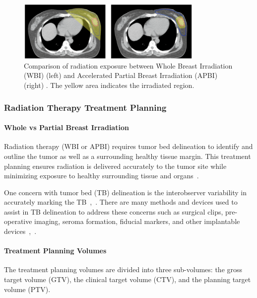 \begin{figure}[h!]
        \centering
        \includegraphics[width=0.8\textwidth]{../figs/introduction/WBI_vs_APBI_irradiation_comparison.png}
        \caption{Comparison of radiation exposure between Whole Breast Irradiation (WBI) (left) and Accelerated Partial Breast Irradiation (APBI) (right) \cite{RefWorks:RefID:157-thomasscience}. The yellow area indicates the irradiated region.}
        \label{fig:introduction:WBI_vs_APBI_irradiation_comparison}
\end{figure}

\subsubsection{Radiation Therapy Treatment Planning\label{sec:introduction:radiationtherapy:treatmentplanning}}

\paragraph*{Whole vs Partial Breast Irradiation\label{sec:introduction:radiationtherapy:treatmentplanning:WBIvsPBI}}
Radiation therapy (WBI or APBI) requires tumor bed delineation to identify and outline the tumor as well as a surrounding healthy tissue margin. This treatment planning ensures radiation is delivered accurately to the tumor site while minimizing exposure to healthy surrounding tissue and organs~\cite{RefWorks:RefID:197-den2015postlumpectomy}.

One concern with tumor bed (TB) delineation is the interobserver variability in accurately marking the TB~\cite{RefWorks:RefID:197-den2015postlumpectomy},~\cite{RefWorks:RefID:179-yang2013tumor}. There are many methods and devices used to assist in TB delineation to address these concerns such as surgical clips, pre-operative imaging, seroma formation, fiducial markers, and other implantable devices~\cite{RefWorks:RefID:179-yang2013tumor},~\cite{RefWorks:RefID:25-acree2022review}.

\paragraph*{Treatment Planning Volumes\label{sec:introduction:radiationtherapy:treatmentplanning:planningVolumes}}
The treatment planning volumes are divided into three sub-volumes: the gross target volume (GTV), the clinical target volume (CTV), and the planning target volume (PTV).

